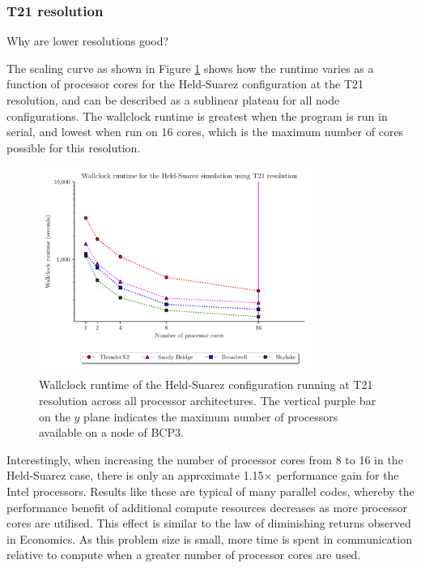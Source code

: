 \documentclass[a4paper,11pt]{report}
\begin{document}
\subsubsection{T21 resolution}
Why are lower resolutions good?
\par
The scaling curve as shown in Figure \ref{fig:t21-scale} shows how the runtime varies as a function of processor cores for the Held-Suarez configuration at the T21 resolution, and can be described as a sublinear plateau for all node configurations. The wallclock runtime is greatest when the program is run in serial, and lowest when run on 16 cores, which is the maximum number of cores possible for this resolution.
\begin{figure}[htbp]
\begin{center}
\includegraphics[width=0.8\textwidth]{img/scaling_graph_T21_Held_suarez.pdf}
\caption{Wallclock runtime of the Held-Suarez configuration running at T21 resolution across all processor architectures. The vertical purple bar on the $y$ plane indicates the maximum number of processors available on a node of BCP3.}
\label{fig:t21-scale}
\end{center}
\end{figure}
\par
Interestingly, when increasing the number of processor cores from 8 to 16 in the Held-Suarez case, there is only an approximate 1.15$\times$ performance gain for the Intel processors. Results like these are typical of many parallel codes, whereby the performance benefit of additional compute resources decreases as more processor cores are utilised. This effect is similar to the law of diminishing returns observed in Economics. As this problem size is small, more time is spent in communication relative to compute when a greater number of processor cores are used.
\par
\end{document}
